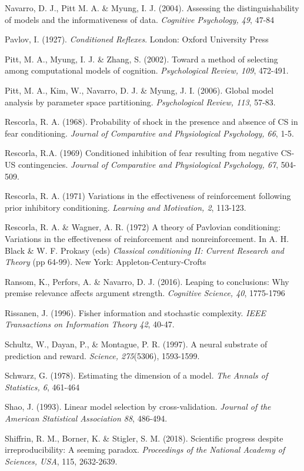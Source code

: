 \documentclass[doc]{apa6}
\theoremstyle{definition}
\theoremstyle{definition}
\theoremstyle{definition}
\theoremstyle{remark}
\begin{document}
Navarro, D. J., Pitt M. A. \& Myung, I. J. (2004). Assessing the
distinguishability of models and the informativeness of data.
\emph{Cognitive Psychology, 49}, 47-84

Pavlov, I. (1927). \emph{Conditioned Reflexes}. London: Oxford
University Press

Pitt, M. A., Myung, I. J. \& Zhang, S. (2002). Toward a method of
selecting among computational models of cognition. \emph{Psychological
Review, 109}, 472-491.

Pitt, M. A., Kim, W., Navarro, D. J. \& Myung, J. I. (2006). Global
model analysis by parameter space partitioning. \emph{Psychological
Review, 113}, 57-83.

Rescorla, R. A. (1968). Probability of shock in the presence and absence
of CS in fear conditioning. \emph{Journal of Comparative and
Physiological Psychology, 66}, 1-5.

Rescorla, R.A. (1969) Conditioned inhibition of fear resulting from
negative CS-US contingencies. \emph{Journal of Comparative and
Physiological Psychology, 67}, 504-509.

Rescorla, R. A. (1971) Variations in the effectiveness of reinforcement
following prior inhibitory conditioning. \emph{Learning and Motivation,
2}, 113-123.

Rescorla, R. A. \& Wagner, A. R. (1972) A theory of Pavlovian
conditioning: Variations in the effectiveness of reinforcement and
nonreinforcement. In A. H. Black \& W. F. Prokasy (eds) \emph{Classical
conditioning II: Current Research and Theory} (pp 64-99). New York:
Appleton-Century-Crofts

Ransom, K., Perfors, A. \& Navarro, D. J. (2016). Leaping to
conclusions: Why premise relevance affects argument strength.
\emph{Cognitive Science, 40}, 1775-1796

Rissanen, J. (1996). Fisher information and stochastic complexity.
\emph{IEEE Transactions on Information Theory 42}, 40-47.

Schultz, W., Dayan, P., \& Montague, P. R. (1997). A neural substrate of
prediction and reward. \emph{Science, 275}(5306), 1593-1599.

Schwarz, G. (1978). Estimating the dimension of a model. \emph{The
Annals of Statistics, 6}, 461-464

Shao, J. (1993). Linear model selection by cross-validation.
\emph{Journal of the American Statistical Association 88}, 486-494.

Shiffrin, R. M., Borner, K. \& Stigler, S. M. (2018). Scientific
progress despite irreproducibility: A seeming paradox. \emph{Proceedings
of the National Academy of Sciences, USA}, 115, 2632-2639.
\end{document}
